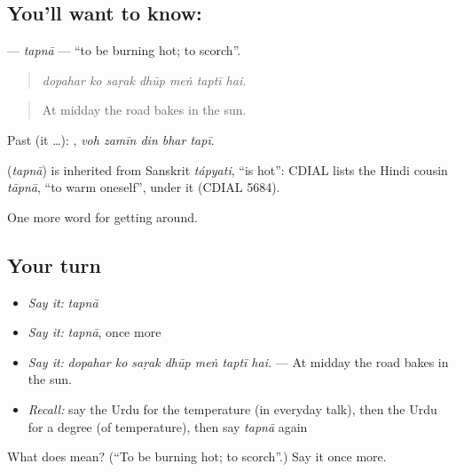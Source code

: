 \subsection*{You'll want to know: }
\textbf{} — \emph{tapnā} — \textquotedblleft{}to be burning hot; to scorch\textquotedblright{}.

\begin{quote}
      
\end{quote}

\begin{quote}
\emph{dopahar ko saṛak dhūp meṅ taptī hai.}
\end{quote}

\begin{quote}
At midday the road bakes in the sun.
\end{quote}

Past (it …):     , \emph{voh zamīn din bhar tapī}.

\begin{cousinweb}
\textbf{} (\emph{tapnā}) is inherited from Sanskrit \emph{tápyati}, \textquotedblleft{}is hot\textquotedblright{}: CDIAL lists the Hindi cousin \emph{tāpnā}, \textquotedblleft{}to warm oneself\textquotedblright{}, under it (CDIAL 5684).
\end{cousinweb}

\begin{grammarlens}[title={What you've built}]
One more word for getting around.
\end{grammarlens}

\subsection*{Your turn}
\begin{itemize}
\raggedright
  \item \emph{Say it:} \emph{tapnā}
  \item \emph{Say it:} \emph{tapnā}, once more
  \item \emph{Say it:} \emph{dopahar ko saṛak dhūp meṅ taptī hai.} — At midday the road bakes in the sun.
  \item \emph{Recall:} say the Urdu for the temperature (in everyday talk), then the Urdu for a degree (of temperature), then say \emph{tapnā} again
\end{itemize}

\begin{tcolorbox}[breakable,colback=teal!4,colframe=teal!35!black,title={Before you move on}]
What does  mean? (\textquotedblleft{}To be burning hot; to scorch\textquotedblright{}.) Say it once more.
\end{tcolorbox}
